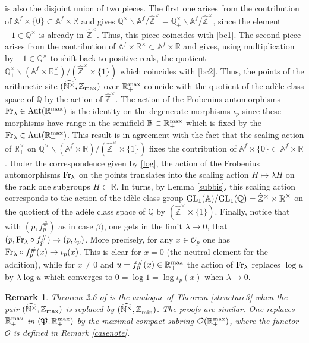 \documentclass[noams,lp]{compositio}
\newtheorem{rem}[thm]{Remark}
\def\Aut{{\rm Aut}}
\def\GL{{\rm GL}}
\def\A{{\mathbb A}}
\def\B{{\mathbb B}}
\def\N{{\mathbb N}}
\def\Q{{\mathbb Q}}
\def\R{{\mathbb R}}
\def\Z{{\mathbb Z}}
\def\pt{\mathfrak P}
\def\cO{{\mathcal O}}
\def\zminp{\Z_{\rm min}^+}
\def\zmax{{\Z_{\rm max}}}
\def\rmax{\R_+^{\rm max}}
\def\fr{{\rm Fr}}
\def\arith{{(\wnt,\bar \N)}}
\def\wnt{{\widehat{\N^{\times}}}}
\def\arith{{(\wnt,\zmax)}}
\def\hatz{{\hat\Z^\times}}
\begin{document}
is also the disjoint union of two pieces. The first one arises from the contribution of $\A^f\times \{0\}\subset \A^f\times \R$ and gives $\Q^\times\backslash\A^f/\hatz=\Q_+^\times\backslash\A^f/\hatz$, since the element $-1\in \Q^\times$ is already in $\hatz$. Thus, this piece coincides with \eqref{bc1}. The second piece arises from the contribution of $\A^f\times \R^\times\subset \A^f\times \R$ and gives, using multiplication by $-1\in \Q^\times$ to shift back to positive reals, the quotient $\Q_+^\times\backslash(\A^f\times \R_+^\times)/(\hatz\times \{1\})$ which coincides with \eqref{bc2}. Thus, the points of the arithmetic site  $\arith$ over $\rmax$ coincide with the quotient of the ad\`ele class space of $\Q$ by the action of $\hatz$. The action of the Frobenius automorphisms $\fr_\lambda\in \Aut(\rmax)$ is the identity on the degenerate morphisms $\iota_p$ since these morphisms have range in the semifield $\B\subset \rmax$ which is fixed by the  $\fr_\lambda\in \Aut(\rmax)$. This result is in agreement with the fact that the scaling action of $\R_+^\times$ on $\Q^\times\backslash(\A^f\times \R)/(\hatz\times \{1\})$ fixes the contribution of $\A^f\times \{0\}\subset \A^f\times \R$. Under the correspondence given by \eqref{log}, the action of the Frobenius automorphisms $\fr_\lambda$ on the points translates into the scaling action $H\mapsto \lambda H$ on the rank one subgroups $H\subset \R$. In turns, by Lemma \ref{subbis}, this scaling action corresponds to the  action of the id\`ele class group $\GL_1(\A)/\GL_1(\Q)=\hatz\times \R_+^\times$ on the  quotient of the ad\`ele class space of $\Q$ by $(\hatz\times \{1\})$. Finally, notice that with $(p,f^\#_p)$ as in case $\beta)$, one gets in the limit $\lambda\to 0$, that $(p,\fr_\lambda\circ f^\#_p)\to (p,\iota_p)$. More precisely,  for any $x\in \cO_p$ one has $\fr_\lambda\circ f^\#_p(x)\to \iota_p(x)$. This is clear for $x=0$ (the neutral element for the addition), while for $x\neq 0$ and $u=f^\#_p(x)\in \rmax$ the action of $\fr_\lambda$ replaces $\log u$ by $\lambda \log u$ which converges to $0=\log 1=\log \iota_p(x)$ when $\lambda\to 0$.\endproof

\begin{rem}\label{casenote1}{\rm  Theorem 2.6 of \cite{CCas}  is  the analogue of  Theorem \ref{structure3} when the pair $\arith$ is replaced  by $(\wnt,\zminp)$. The proofs are similar. One replaces $\rmax$ in  $(\pt,\rmax)$ by the maximal compact subring $\cO(\rmax)$, where the functor $\cO$ is  defined in Remark \ref{casenote}.
}\end{rem}
\end{document}
